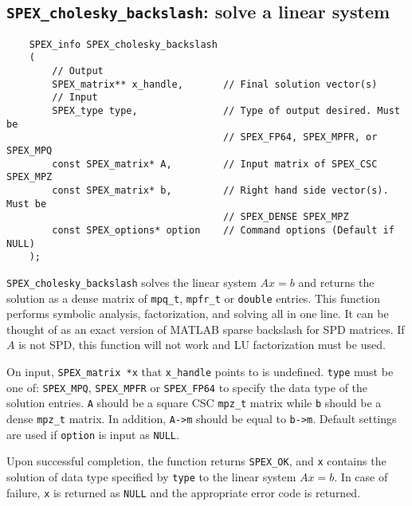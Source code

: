\documentclass[12pt,oneside]{book}
\theoremstyle{definition}
\begin{document}
\subsection{\texttt{SPEX\_cholesky\_backslash}: solve a linear system}
\label{ss:SPEX_Chol_backslash}
\begin{mdframed}[userdefinedwidth=\textwidth]
{\footnotesize
\begin{verbatim}
    SPEX_info SPEX_cholesky_backslash
    (
        // Output
        SPEX_matrix** x_handle,       // Final solution vector(s)
        // Input
        SPEX_type type,               // Type of output desired. Must be
                                      // SPEX_FP64, SPEX_MPFR, or SPEX_MPQ
        const SPEX_matrix* A,         // Input matrix of SPEX_CSC SPEX_MPZ
        const SPEX_matrix* b,         // Right hand side vector(s). Must be
                                      // SPEX_DENSE SPEX_MPZ 
        const SPEX_options* option    // Command options (Default if NULL)
    );
\end{verbatim}
} \end{mdframed}

\verb|SPEX_cholesky_backslash| solves the linear system $Ax=b$ and returns the solution
as a dense matrix of \verb|mpq_t|, \verb|mpfr_t| or \verb|double| entries. This
function performs symbolic analysis, factorization, and solving all in one line. 
It can be thought of as an exact version of MATLAB sparse backslash for SPD matrices.
If $A$ is not SPD, this function will not work and LU factorization must be used.

On input, \verb|SPEX_matrix *x| that \verb|x_handle| points to is undefined. \verb|type| must be one of:
\verb|SPEX_MPQ|, \verb|SPEX_MPFR| or \verb|SPEX_FP64| to specify the data type
of the solution entries. \verb|A| should be a square CSC \verb|mpz_t| matrix
while \verb|b| should be a dense \verb|mpz_t| matrix. In addition, \verb|A->m|
should be equal to \verb|b->m|.  Default settings are used if
\verb|option| is input as \verb|NULL|.

Upon successful completion, the function returns \verb|SPEX_OK|, and
\verb|x| contains the solution of data type specified by
\verb|type| to the linear system $Ax=b$. In case of failure, \verb|x| is returned as \verb|NULL| and the appropriate error code is returned.


\end{document}
